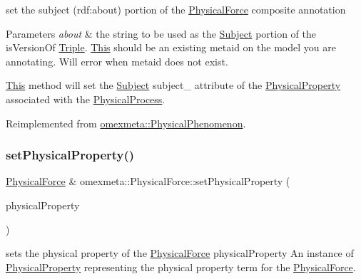 set the subject (rdf\+:about) portion of the \hyperlink{classomexmeta_1_1PhysicalForce}{Physical\+Force} composite annotation 


\begin{DoxyParams}{Parameters}
{\em about} & the string to be used as the \hyperlink{classomexmeta_1_1Subject}{Subject} portion of the is\+Version\+Of \hyperlink{classomexmeta_1_1Triple}{Triple}. \hyperlink{classThis}{This} should be an existing metaid on the model you are annotating. Will error when metaid does not exist.\\
\hline
\end{DoxyParams}
\hyperlink{classThis}{This} method will set the \hyperlink{classomexmeta_1_1Subject}{Subject} subject\+\_\+ attribute of the \hyperlink{classomexmeta_1_1PhysicalProperty}{Physical\+Property} associated with the \hyperlink{classomexmeta_1_1PhysicalProcess}{Physical\+Process}. 

Reimplemented from \hyperlink{classomexmeta_1_1PhysicalPhenomenon}{omexmeta\+::\+Physical\+Phenomenon}.

\mbox{\label{classomexmeta_1_1PhysicalForce_a081aecc43d16b2fc8826c4050eb2055d}} 
\subsubsection{\texorpdfstring{set\+Physical\+Property()}{setPhysicalProperty()}\hspace{0.1cm}{\footnotesize\ttfamily [1/2]}}
{\footnotesize\ttfamily \hyperlink{classomexmeta_1_1PhysicalForce}{Physical\+Force} \& omexmeta\+::\+Physical\+Force\+::set\+Physical\+Property (\begin{DoxyParamCaption}\item[{\hyperlink{classomexmeta_1_1PhysicalProperty}{Physical\+Property}}]{physical\+Property }\end{DoxyParamCaption})}



sets the physical property of the \hyperlink{classomexmeta_1_1PhysicalForce}{Physical\+Force}  physical\+Property An instance of \hyperlink{classomexmeta_1_1PhysicalProperty}{Physical\+Property} representing the physical property term for the \hyperlink{classomexmeta_1_1PhysicalForce}{Physical\+Force}. 

